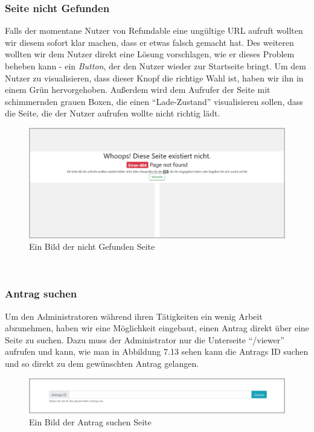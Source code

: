 \subsubsection{Seite nicht Gefunden}
Falls der momentane Nutzer von Refundable eine ungültige URL aufruft wollten wir diesem sofort klar machen, dass er etwas falsch gemacht hat. Des weiteren wollten wir dem Nutzer direkt eine Lösung vorschlagen, wie er dieses Problem beheben kann - ein \textit{Button}, der den Nutzer wieder zur Startseite bringt. Um dem Nutzer zu visualisieren, dass dieser Knopf die richtige Wahl ist, haben wir ihn in einem Grün hervorgehoben. Außerdem wird dem Aufrufer der Seite mit schimmernden grauen Boxen, die einen \enquote{Lade-Zustand} visualisieren sollen, dass die Seite, die der Nutzer aufrufen wollte nicht richtig lädt.
\begin{figure}[H]
	\centering
	\includegraphics[width=1\linewidth]{images/website/notfound}
	\caption[Neuer Schulantrag]{Ein Bild der nicht Gefunden Seite}
	\label{fig:notfoundsite}
\end{figure}
~\\

\newpage
\subsubsection{Antrag suchen}
Um den Administratoren während ihren Tätigkeiten ein wenig Arbeit abzunehmen, haben wir eine Möglichkeit eingebaut, einen Antrag direkt über eine Seite zu suchen. Dazu muss der Administrator nur die Unterseite \enquote{/viewer} aufrufen und kann, wie man in Abbildung 7.13 sehen kann die Antrags ID suchen und so direkt zu dem gewünschten Antrag gelangen.
\begin{figure}[H]
	\centering
	\includegraphics[width=1\linewidth]{images/website/search}
	\caption[Neuer Schulantrag]{Ein Bild der Antrag suchen Seite}
	\label{fig:searchsite}
\end{figure}
~\\

